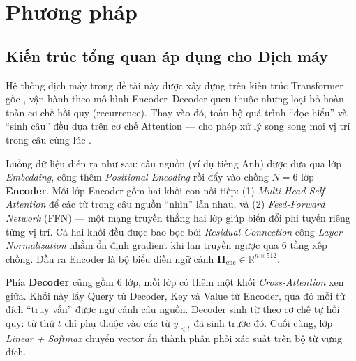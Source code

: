 \documentclass[a4paper,12pt,twoside]{report}
\begin{document}
\chapter{Phương pháp}

\section{Kiến trúc tổng quan áp dụng cho Dịch máy}

Hệ thống dịch máy trong đề tài này được xây dựng trên kiến trúc Transformer gốc \cite{vaswani2017attention}, vận hành theo mô hình Encoder--Decoder quen thuộc nhưng loại bỏ hoàn toàn cơ chế hồi quy (recurrence). Thay vào đó, toàn bộ quá trình ``đọc hiểu'' và ``sinh câu'' đều dựa trên cơ chế Attention --- cho phép xử lý song song mọi vị trí trong câu cùng lúc \cite{nlp_ebook}.

Luồng dữ liệu diễn ra như sau: câu nguồn (ví dụ tiếng Anh) được đưa qua lớp \textit{Embedding}, cộng thêm \textit{Positional Encoding} rồi đẩy vào chồng $N = 6$ lớp \textbf{Encoder}. Mỗi lớp Encoder gồm hai khối con nối tiếp: (1) \textit{Multi-Head Self-Attention} để các từ trong câu nguồn ``nhìn'' lẫn nhau, và (2) \textit{Feed-Forward Network} (FFN) --- một mạng truyền thẳng hai lớp giúp biến đổi phi tuyến riêng từng vị trí. Cả hai khối đều được bao bọc bởi \textit{Residual Connection} cộng \textit{Layer Normalization} nhằm ổn định gradient khi lan truyền ngược qua 6 tầng xếp chồng. Đầu ra Encoder là bộ biểu diễn ngữ cảnh $\mathbf{H}_{\text{enc}} \in \mathbb{R}^{n \times 512}$.

Phía \textbf{Decoder} cũng gồm 6 lớp, mỗi lớp có thêm một khối \textit{Cross-Attention} xen giữa. Khối này lấy Query từ Decoder, Key và Value từ Encoder, qua đó mỗi từ đích ``truy vấn'' được ngữ cảnh câu nguồn. Decoder sinh từ theo cơ chế tự hồi quy: từ thứ $t$ chỉ phụ thuộc vào các từ $y_{<t}$ đã sinh trước đó. Cuối cùng, lớp \textit{Linear + Softmax} chuyển vector ẩn thành phân phối xác suất trên bộ từ vựng đích.
\end{document}
